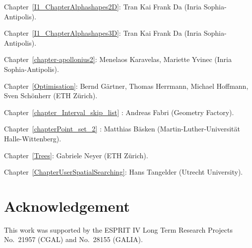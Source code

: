 \noindent
Chapter~\ref{I1_ChapterAlphashapes2D}: 
Tran Kai Frank Da ({\sc Inria} Sophia-Antipolis).

\noindent
Chapter~\ref{I1_ChapterAlphashapes3D}: 
Tran Kai Frank Da ({\sc Inria} Sophia-Antipolis).

\noindent
Chapter~\ref{chapter-apollonius2}: Menelaos Karavelas, Mariette Yvinec ({\sc Inria} Sophia-Antipolis).



\noindent
Chapter~\ref{Optimisation}: Bernd G\"artner, Thomas Herrmann, Michael Hoffmann,
Sven Sch\"onherr (ETH Z\"urich).

\noindent
Chapter~\ref{chapter_Interval_skip_list} : Andreas Fabri ({\sc Geometry Factory}).

\noindent
Chapter~\ref{chapterPoint_set_2} : Matthias B\"asken (Martin-Luther-Universit{\"a}t Halle-Wittenberg).

\noindent
Chapter~\ref{Trees}: Gabriele Neyer (ETH Z\"urich).

\noindent
Chapter~\ref{ChapterUserSpatialSearching}: Hans Tangelder (Utrecht University).

\section*{Acknowledgement}


This work was supported
by the ESPRIT IV Long Term Research Projects No.~21957 (CGAL)
and No.~28155 (GALIA).



